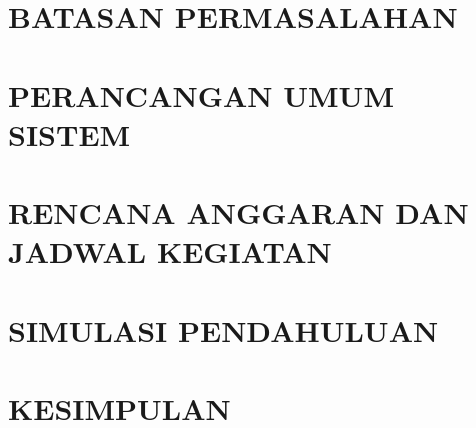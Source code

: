 \documentclass{DTETI_CP_C251}
\begin{document}
\chapter{\uppercase{Batasan Permasalahan}}
\label{chap:Batasan_Permasalahan}


\chapter{\uppercase{Perancangan Umum Sistem}}
\label{chap:Perancangan_Umum_Sistem}


\chapter{\uppercase{Rencana Anggaran dan Jadwal Kegiatan}}
\label{chap:RAB_JadwalKegiatan}


\chapter{\uppercase{Simulasi Pendahuluan}}
\label{chap:Simulasi_Pendahuluan}


\chapter{\uppercase{Kesimpulan}}
\label{chap:Kesimpulan}



\begin{thebibliography}{}

    

\end{thebibliography}
\appendix


\end{document}

